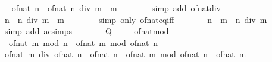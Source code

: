 \begin{isabellebody}
\ \isamarkupfalse%
\ {\isachardoublequoteopen}of{\isacharunderscore}{\kern0pt}nat\ n\ {\isacharequal}{\kern0pt}\ of{\isacharunderscore}{\kern0pt}nat\ {\isacharparenleft}{\kern0pt}n\ div\ m\ {\isacharasterisk}{\kern0pt}\ m{\isacharparenright}{\kern0pt}{\isachardoublequoteclose}\isanewline
\ \ \ \ \ \ \isamarkupfalse%
\ {\isacharparenleft}{\kern0pt}simp\ add{\isacharcolon}{\kern0pt}\ of{\isacharunderscore}{\kern0pt}nat{\isacharunderscore}{\kern0pt}div{\isacharparenright}{\kern0pt}\isanewline
\ \ \ \ \isamarkupfalse%
\ \isamarkupfalse%
\ {\isachardoublequoteopen}n\ {\isacharequal}{\kern0pt}\ n\ div\ m\ {\isacharasterisk}{\kern0pt}\ m{\isachardoublequoteclose}\isanewline
\ \ \ \ \ \ \isamarkupfalse%
\ {\isacharparenleft}{\kern0pt}simp\ only{\isacharcolon}{\kern0pt}\ of{\isacharunderscore}{\kern0pt}nat{\isacharunderscore}{\kern0pt}eq{\isacharunderscore}{\kern0pt}iff{\isacharparenright}{\kern0pt}\isanewline
\ \ \ \ \isamarkupfalse%
\ \isamarkupfalse%
\ {\isachardoublequoteopen}n\ {\isacharequal}{\kern0pt}\ m\ {\isacharasterisk}{\kern0pt}\ {\isacharparenleft}{\kern0pt}n\ div\ m{\isacharparenright}{\kern0pt}{\isachardoublequoteclose}\isanewline
\ \ \ \ \ \ \isamarkupfalse%
\ {\isacharparenleft}{\kern0pt}simp\ add{\isacharcolon}{\kern0pt}\ ac{\isacharunderscore}{\kern0pt}simps{\isacharparenright}{\kern0pt}\isanewline
\ \ \ \ \isamarkupfalse%
\ \isamarkupfalse%
\ {\isacharquery}{\kern0pt}Q\ \isacommand{{\isachardot}{\kern0pt}{\isachardot}{\kern0pt}}\isamarkupfalse%
\isanewline
\ \ \isamarkupfalse%
\isanewline
{}\isamarkupfalse%
%
\endisatagproof
{\isafoldproof}%
%
\isadelimproof
\isanewline
%
\endisadelimproof
\isanewline
{}\isamarkupfalse%
\ of{\isacharunderscore}{\kern0pt}nat{\isacharunderscore}{\kern0pt}mod{\isacharcolon}{\kern0pt}\isanewline
\ \ {\isachardoublequoteopen}of{\isacharunderscore}{\kern0pt}nat\ {\isacharparenleft}{\kern0pt}m\ mod\ n{\isacharparenright}{\kern0pt}\ {\isacharequal}{\kern0pt}\ of{\isacharunderscore}{\kern0pt}nat\ m\ mod\ of{\isacharunderscore}{\kern0pt}nat\ n{\isachardoublequoteclose}\isanewline
%
\isadelimproof
%
\endisadelimproof
%
\isatagproof
{}\isamarkupfalse%
\ {\isacharminus}{\kern0pt}\isanewline
\ \ \isamarkupfalse%
\ {\isachardoublequoteopen}of{\isacharunderscore}{\kern0pt}nat\ m\ div\ of{\isacharunderscore}{\kern0pt}nat\ n\ {\isacharasterisk}{\kern0pt}\ of{\isacharunderscore}{\kern0pt}nat\ n\ {\isacharplus}{\kern0pt}\ of{\isacharunderscore}{\kern0pt}nat\ m\ mod\ of{\isacharunderscore}{\kern0pt}nat\ n\ {\isacharequal}{\kern0pt}\ of{\isacharunderscore}{\kern0pt}nat\ m{\isachardoublequoteclose}\isanewline

\end{isabellebody}

